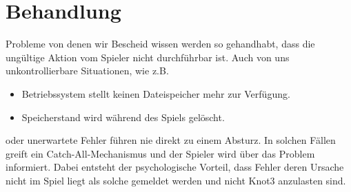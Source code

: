 %



\section{Behandlung}
\label{Abschnitt:Ausnahmen:Behandlungen}

Probleme von denen wir Bescheid wissen werden so gehandhabt, dass die ungültige Aktion vom Spieler nicht durchführbar ist. Auch von uns unkontrollierbare Situationen, wie z.B.

\begin{itemize}

	\item Betriebssystem stellt keinen Dateispeicher mehr zur Verfügung.
	
	\item Speicherstand wird während des Spiels gelöscht.

\end{itemize}

oder unerwartete Fehler führen nie direkt zu einem Absturz. In solchen Fällen greift ein \glqq Catch-All\grqq-Mechanismus und der Spieler wird über das Problem informiert. Dabei entsteht der psychologische Vorteil, dass Fehler deren Ursache nicht im Spiel liegt als solche gemeldet werden und nicht Knot3 anzulasten sind.\\


